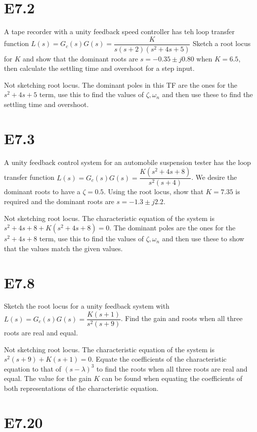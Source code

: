 \documentclass[11pt]{article}
\begin{document}
\section{E7.2}

A tape recorder with a unity feedback speed controller has teh loop transfer function $L(s) = G_c(s) G(s) = \dfrac{K}{s(s+ 2)(s^2 + 4s + 5)}$ Sketch a root locus for $K$ and show that the dominant roots are $s = -0.35 \pm j 0.80$ when $K = 6.5$, then calculate the settling time and overshoot for a step input.

Not sketching root locus. The dominant poles in this TF are the ones for the $s^2 + 4s + 5$ term, use this to find the values of $\zeta, \omega_n$ and then use these to find the settling time and overshoot.

\section{E7.3}

A unity feedback control system for an automobile suspension tester has the loop transfer function $L(s) = G_c(s) G(s) = \dfrac{K(s^2 + 4s + 8)}{s^2(s + 4)}$. We desire the dominant roots to have a $\zeta = 0.5$. Using the root locus, show that $K = 7.35$ is required and the dominant roots are $s = -1.3 \pm j 2.2$.

Not sketching root locus. The characteristic equation of the system is $s^2 + 4s + 8 + K(s^2 + 4s + 8) = 0$. The dominant poles are the ones for the $s^2 + 4s + 8$ term, use this to find the values of $\zeta, \omega_n$ and then use these to show that the values match the given values.

\section{E7.8}

Sketch the root locus for a unity feedback system with $L(s) = G_c(s) G(s) = \dfrac{K(s + 1)}{s^2 (s + 9)}$. Find the gain and roots when all three roots are real and equal.

Not sketching root locus. The characteristic equation of the system is $s^2 (s + 9) + K(s + 1) = 0$. Equate the coefficients of the characteristic equation to that of $(s - \lambda)^3$ to find the roots when all three roots are real and equal. The value for the gain $K$ can be found when equating the coefficients of both representations of the characteristic equation.

\section{E7.20}
\end{document}
